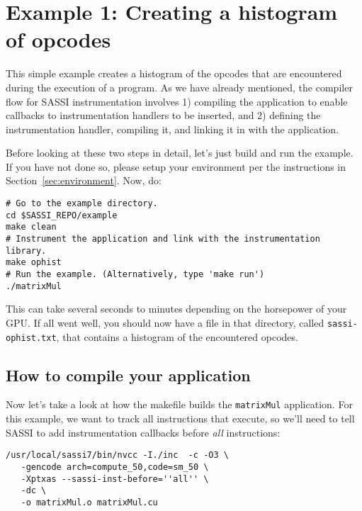 \section{Example 1: Creating a histogram of opcodes}
\label{sec:example1}

This simple example creates a histogram of the opcodes that are
encountered during the execution of a program.  As we have already
mentioned, the compiler flow for SASSI instrumentation involves
1) compiling the application to enable callbacks to instrumentation
handlers to be inserted, and 2) defining the instrumentation handler,
compiling it, and linking it in with the application. 

Before looking at these two steps in detail, let's just build and run
the example.  If you have not done so, please setup your environment
per the instructions in Section~\ref{sec:environment}.  Now, do:
\begin{lstlisting}[style=BashInputStyle]
# Go to the example directory.
cd $SASSI_REPO/example
make clean
# Instrument the application and link with the instrumentation library.
make ophist
# Run the example. (Alternatively, type 'make run')
./matrixMul
\end{lstlisting}

This can take several seconds to minutes depending on the horsepower
of your GPU. If all went well, you should now have a file in that
directory, called \texttt{sassi-ophist.txt}, that contains a histogram
of the encountered opcodes.

\subsection{How to compile your application}

Now let's take a look at how the makefile builds the
\texttt{matrixMul} application.  For this example, we want to track
all instructions that execute, so we'll need to tell SASSI to add
instrumentation callbacks before \emph{all} instructions:
\begin{lstlisting}[style=BashInputStyle]
/usr/local/sassi7/bin/nvcc -I./inc  -c -O3 \
   -gencode arch=compute_50,code=sm_50 \
   -Xptxas --sassi-inst-before=''all'' \
   -dc \
   -o matrixMul.o matrixMul.cu
\end{lstlisting}

